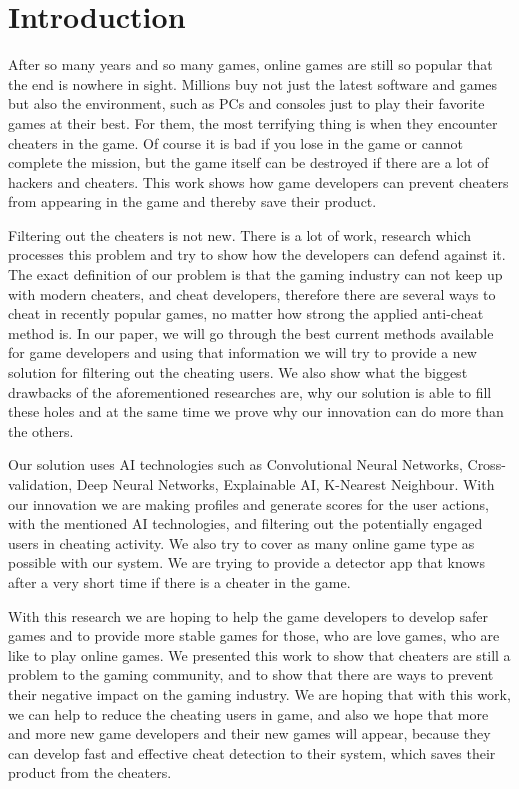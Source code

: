 \section{Introduction}
\label{ch:intro}

After so many years and so many games, online games are still so popular that the end is nowhere in sight.
Millions buy not just the latest software and games but also the environment, such as PCs and consoles just to play their favorite games at their best.
For them, the most terrifying thing is when they encounter cheaters in the game.
Of course it is bad if you lose in the game or cannot complete the mission, but the game itself can be destroyed if there are a lot of hackers and cheaters.
This work shows how game developers can prevent cheaters from appearing in the game and thereby save their product.

Filtering out the cheaters is not new. 
There is a lot of work, research which processes this problem and try to show how the developers can defend against it.
The exact definition of our problem is that the gaming industry can not keep up with modern cheaters, and cheat developers, therefore there are several ways to cheat in recently popular games, no matter how strong the applied anti-cheat method is. 
In our paper, we will go through the best current methods available for game developers and using that information we will try to provide a new solution for filtering out the cheating users.
We also show what the biggest drawbacks of the aforementioned researches are, why our solution is able to fill these holes and at the same time we prove why our innovation can do more than the others.

Our solution uses AI technologies such as Convolutional Neural Networks, Cross-validation, Deep Neural Networks, Explainable AI, K-Nearest Neighbour.
With our innovation we are making profiles and generate scores for the user actions, with the mentioned AI technologies, and filtering out the potentially engaged users in cheating activity. 
We also try to cover as many online game type as possible with our system. We are trying to provide a detector app that knows after a very short time if there is a cheater in the game.

With this research we are hoping to help the game developers to develop safer games and to provide more stable games for those, who are love games, who are like to play online games.
We presented this work to show that cheaters are still a problem to the gaming community, and to show that there are ways to prevent their negative impact on the gaming industry.
We are hoping that with this work, we can help to reduce the cheating users in game, and also we hope that more and more new game developers and their new games will appear, because they can develop fast and effective cheat detection to their system, which saves their product from the cheaters.

